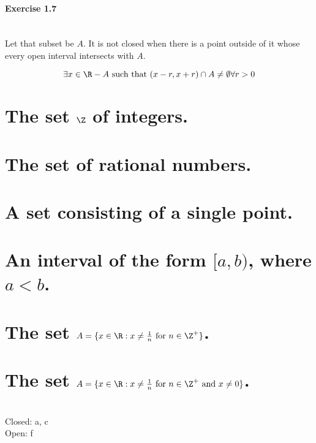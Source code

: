 \subsection{Exercise 1.7}
\setcounter{question}{0}


\begin{solution}
 \\Let that subset be $A$. It is not closed when there is a point outside of it whose every open interval intersects with $A$.
 
 $$\exists x \in \R - A \text{ such that } (x-r,x+r) \cap A \neq \emptyset \forall r > 0$$
\end{solution}


\begin{parts}
 
 \part{The set $\Z$ of integers.}
 \part{The set of rational numbers.}
 \part{A set consisting of a single point.}
 \part{An interval of the form $[a,b)$, where $a < b$.}
 \part{The set $A = \{x\in\R: x \neq \frac{1}{n} \text{ for } n \in \Z^+\}$.}
 \part{The set $A = \{x\in\R: x \neq \frac{1}{n} \text{ for } n \in \Z^+ \text{ and } x \neq 0\}$.}
 
 
\begin{solution}
 \\Closed: a, c \\
 Open: f
\end{solution}

\end{parts}

